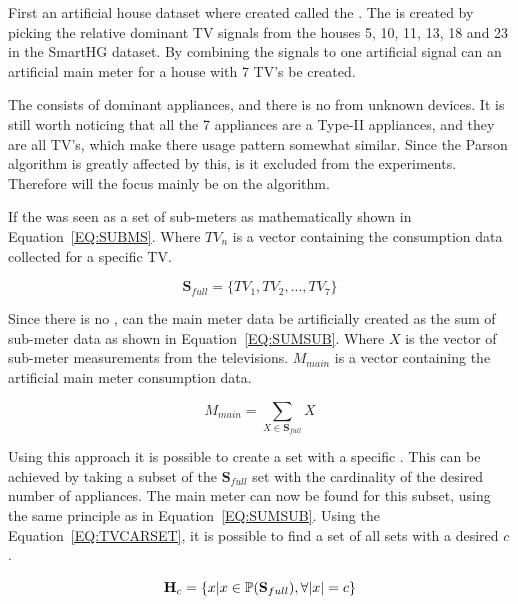 First an artificial house dataset where created called the . The  is created by picking the relative dominant TV signals from the houses 5, 10, 11, 13, 18 and 23 in the SmartHG dataset. By combining the signals to one artificial signal can an artificial main meter for a house with 7 TV's be created. 

The  consists of dominant appliances, and there is no  from unknown devices. It is still worth noticing that all the 7 appliances are a Type-II appliances, and they are all TV's, which make there usage pattern somewhat similar. Since the Parson algorithm is greatly affected by this, is it excluded from the experiments. Therefore will the focus mainly be on the  algorithm. 

If the  was seen as a set of sub-meters as mathematically shown in Equation~\ref{EQ:SUBMS}. Where $TV_n$ is a vector containing the consumption data collected for a specific TV.

\begin{equation}
	\textbf{S}_{full} = \{ TV_1, TV_2, ... , TV_7 \}
	\label{EQ:SUBMS}
\end{equation}

Since there is no , can the main meter data be artificially created as the sum of sub-meter data as shown in Equation~\ref{EQ:SUMSUB}. Where $X$ is the vector of sub-meter measurements from the televisions. $M_{main}$ is a vector containing the artificial main meter consumption data. 

\begin{equation}
	M_{main} = \sum_{X \in \textbf{S}_{full}}X
	\label{EQ:SUMSUB}
\end{equation}

Using this approach it is possible to create a set with a specific . This can be achieved by taking a subset of the $\textbf{S}_{full}$ set with the cardinality of the desired number of appliances. The main meter can now be found for this subset, using the same principle as in Equation~\ref{EQ:SUMSUB}. Using the Equation~\ref{EQ:TVCARSET}, it is possible to find a set of all sets with a desired  $c$.

\begin{equation}
	\textbf{H}_c = \{ x | x \in \mathbb{P}(\textbf{S}_{full}), \forall |x| = c   \}
	\label{EQ:TVCARSET}
\end{equation}

